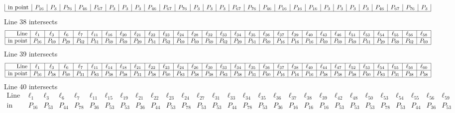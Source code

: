 \documentclass{article}
\begin{document}
{$$\begin{array}{|r*{28}{|c}|}
\mbox{in point}  & P_{16} & P_{3} & P_{76} & P_{46} & P_{67} & P_{3} & P_{3} & P_{3} & P_{46} & P_{67} & P_{76} & P_{3} & P_{3} & P_{3} & P_{67} & P_{76} & P_{46} & P_{16} & P_{16} & P_{16} & P_{3} & P_{3} & P_{3} & P_{3} & P_{46} & P_{67} & P_{76} & P_{3}\\
\hline
\end{array}
$$
Line 38 intersects 
$$
\begin{array}{|r*{28}{|c}|}
\hline
\mbox{Line}  & \ell_{1} & \ell_{3} & \ell_{6} & \ell_{7} & \ell_{11} & \ell_{16} & \ell_{20} & \ell_{21} & \ell_{22} & \ell_{23} & \ell_{24} & \ell_{28} & \ell_{32} & \ell_{33} & \ell_{34} & \ell_{35} & \ell_{36} & \ell_{37} & \ell_{39} & \ell_{40} & \ell_{43} & \ell_{46} & \ell_{51} & \ell_{53} & \ell_{54} & \ell_{55} & \ell_{56} & \ell_{58}\\
\hline
\mbox{in point}  & P_{16} & P_{69} & P_{29} & P_{62} & P_{51} & P_{69} & P_{69} & P_{29} & P_{51} & P_{62} & P_{69} & P_{69} & P_{69} & P_{62} & P_{29} & P_{51} & P_{69} & P_{16} & P_{16} & P_{16} & P_{69} & P_{69} & P_{69} & P_{51} & P_{29} & P_{69} & P_{62} & P_{69}\\
\hline
\end{array}
$$
Line 39 intersects 
$$
\begin{array}{|r*{28}{|c}|}
\hline
\mbox{Line}  & \ell_{1} & \ell_{3} & \ell_{6} & \ell_{7} & \ell_{11} & \ell_{14} & \ell_{18} & \ell_{21} & \ell_{22} & \ell_{23} & \ell_{24} & \ell_{26} & \ell_{30} & \ell_{33} & \ell_{34} & \ell_{35} & \ell_{36} & \ell_{37} & \ell_{38} & \ell_{40} & \ell_{44} & \ell_{47} & \ell_{52} & \ell_{53} & \ell_{54} & \ell_{55} & \ell_{56} & \ell_{60}\\
\hline
\mbox{in point}  & P_{16} & P_{38} & P_{60} & P_{31} & P_{83} & P_{38} & P_{38} & P_{31} & P_{38} & P_{60} & P_{83} & P_{38} & P_{38} & P_{83} & P_{38} & P_{31} & P_{60} & P_{16} & P_{16} & P_{16} & P_{38} & P_{38} & P_{38} & P_{60} & P_{83} & P_{31} & P_{38} & P_{38}\\
\hline
\end{array}
$$
Line 40 intersects 
$$
\begin{array}{|r*{28}{|c}|}
\hline
\mbox{Line}  & \ell_{1} & \ell_{3} & \ell_{6} & \ell_{7} & \ell_{11} & \ell_{15} & \ell_{19} & \ell_{21} & \ell_{22} & \ell_{23} & \ell_{24} & \ell_{27} & \ell_{31} & \ell_{33} & \ell_{34} & \ell_{35} & \ell_{36} & \ell_{37} & \ell_{38} & \ell_{39} & \ell_{42} & \ell_{48} & \ell_{50} & \ell_{53} & \ell_{54} & \ell_{55} & \ell_{56} & \ell_{59}\\
\hline
\mbox{in point}  & P_{16} & P_{53} & P_{44} & P_{78} & P_{36} & P_{53} & P_{53} & P_{36} & P_{44} & P_{53} & P_{78} & P_{53} & P_{53} & P_{44} & P_{78} & P_{53} & P_{36} & P_{16} & P_{16} & P_{16} & P_{53} & P_{53} & P_{53} & P_{78} & P_{53} & P_{44} & P_{36} & P_{53}\\

\end{array}$$}
\end{document}
